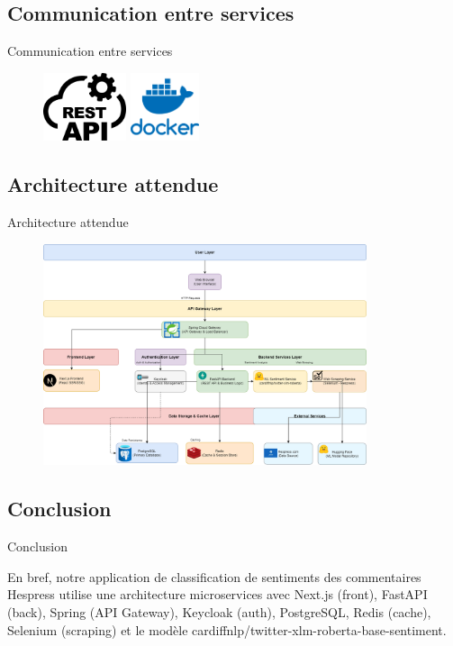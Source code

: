 \subsection{Communication entre services}
\begin{frame}{Communication entre services}
    \begin{figure}[H]
        \centering
        \includegraphics[height=2cm]{assets/images/rest.png}
        \hspace{0.1\textwidth}
        \includegraphics[height=2cm]{assets/images/docker.png}
    \end{figure}
\end{frame}

\subsection{Architecture attendue}
\begin{frame}{Architecture attendue}
    \begin{figure}[H]
        \centering
        \includegraphics[height=6.5cm]{assets/images/arch.png}
    \end{figure}
\end{frame}

\subsection{Conclusion}
\begin{frame}{Conclusion}

    En bref, notre application de classification de sentiments des commentaires Hespress utilise une architecture microservices avec Next.js (front), FastAPI (back), Spring (API Gateway), Keycloak (auth), PostgreSQL, Redis (cache), Selenium (scraping) et le modèle cardiffnlp/twitter-xlm-roberta-base-sentiment.
\end{frame}
